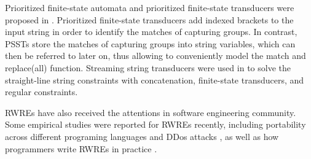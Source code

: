 Prioritized finite-state automata and prioritized finite-state transducers were proposed in \cite{BM17}. Prioritized finite-state transducers add indexed brackets to the input string in order to identify the matches of capturing groups. In contrast, PSSTs store the matches of capturing groups into string variables, which can then be referred to later on, thus allowing to conveniently model the match and replace(all) function. 
%
Streaming string transducers were used in \cite{ZAM19} to solve the straight-line string constraints with concatenation, finite-state transducers, and regular constraints.

RWREs have also received the attentions in software engineering community. Some empirical studies were reported for RWREs recently, including portability across different programing languages \cite{DMC+19} and DDos attacks \cite{SP18}, as well as how programmers write RWREs in practice \cite{MDD+19}.

